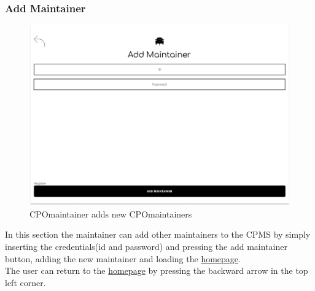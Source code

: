 \subsubsection{Add Maintainer}
\begin{figure}[H]
    \centering
    \includegraphics[keepaspectratio, width=15cm]{Mockup/CPMSSiteInterface/Add Maintainer.png}
    \caption{\ac{CPO}maintainer adds new \ac{CPO}maintainers}
    \label{cpo:Maintainer}
\end{figure}
In this section the maintainer can add other maintainers to the \ac{CPMS} by simply inserting the credentials(id and password) and pressing the add maintainer button, adding the new maintainer and loading the \hyperref[cpo:Homepage]{homepage}.\\
The user can return to the \hyperref[cpo:Homepage]{homepage} by pressing the backward arrow in the top left corner.
\clearpage
